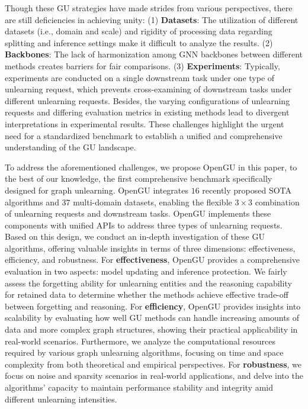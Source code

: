 Though these GU strategies have made strides from various perspectives, there are still deficiencies in achieving unity: (1) \textbf{Datasets}: The utilization of different datasets (i.e., domain and scale) and rigidity of processing data regarding splitting and inference settings make it difficult to analyze the results. 
(2) \textbf{Backbones}: The lack of harmonization among GNN backbones between different methods creates barriers for fair comparisons. (3) \textbf{Experiments}: Typically, experiments are conducted on a single downstream task under one type of unlearning request, which prevents cross-examining of downstream tasks under different unlearning requests. Besides, the varying configurations of unlearning requests and differing evaluation metrics in existing methods lead to divergent interpretations in experimental results. These challenges highlight the urgent need for a standardized benchmark to establish a unified and comprehensive understanding of the GU landscape.

To address the aforementioned challenges, we propose OpenGU in this paper, to the best of our knowledge, the first comprehensive benchmark specifically designed for graph unlearning. OpenGU integrates $16$ recently proposed SOTA algorithms and $37$ multi-domain datasets, enabling the flexible $3\times3$ combination of unlearning requests and downstream tasks. OpenGU implements these components with unified APIs to address three types of unlearning requests. Based on this design, we conduct an in-depth investigation of these GU algorithms, offering valuable insights in terms of three dimensions: effectiveness, efficiency, and robustness. For \textbf{effectiveness}, OpenGU provides a comprehensive evaluation in two aspects: model updating and inference protection. We fairly assess the forgetting ability for unlearning entities and the reasoning capability for retained data to determine whether the methods achieve effective trade-off between forgetting and reasoning. For \textbf{efficiency}, OpenGU provides insights into scalability by evaluating how well GU methods can handle increasing amounts of data and more complex graph structures, showing their practical applicability in real-world scenarios. Furthermore, we analyze the computational resources required by various graph unlearning algorithms, focusing on time and space complexity from both theoretical and empirical perspectives. For \textbf{robustness}, we focus on noise and sparsity scenarios in real-world applications, and delve into the algorithms' capacity to maintain performance stability and integrity amid different unlearning intensities. 


